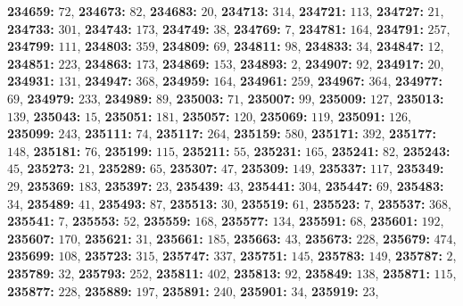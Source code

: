 \textsf{\bfseries 234659:} $72$, \textsf{\bfseries 234673:} $82$, \textsf{\bfseries 234683:} $20$, \textsf{\bfseries 234713:} $314$, \textsf{\bfseries 234721:} $113$, \textsf{\bfseries 234727:} $21$, \textsf{\bfseries 234733:} $301$, \textsf{\bfseries 234743:} $173$, \textsf{\bfseries 234749:} $38$, \textsf{\bfseries 234769:} $7$, \textsf{\bfseries 234781:} $164$, \textsf{\bfseries 234791:} $257$, \textsf{\bfseries 234799:} $111$, \textsf{\bfseries 234803:} $359$, \textsf{\bfseries 234809:} $69$, \textsf{\bfseries 234811:} $98$, \textsf{\bfseries 234833:} $34$, \textsf{\bfseries 234847:} $12$, \textsf{\bfseries 234851:} $223$, \textsf{\bfseries 234863:} $173$, \textsf{\bfseries 234869:} $153$, \textsf{\bfseries 234893:} $2$, \textsf{\bfseries 234907:} $92$, \textsf{\bfseries 234917:} $20$, \textsf{\bfseries 234931:} $131$, \textsf{\bfseries 234947:} $368$, \textsf{\bfseries 234959:} $164$, \textsf{\bfseries 234961:} $259$, \textsf{\bfseries 234967:} $364$, \textsf{\bfseries 234977:} $69$, \textsf{\bfseries 234979:} $233$, \textsf{\bfseries 234989:} $89$, \textsf{\bfseries 235003:} $71$, \textsf{\bfseries 235007:} $99$, \textsf{\bfseries 235009:} $127$, \textsf{\bfseries 235013:} $139$, \textsf{\bfseries 235043:} $15$, \textsf{\bfseries 235051:} $181$, \textsf{\bfseries 235057:} $120$, \textsf{\bfseries 235069:} $119$, \textsf{\bfseries 235091:} $126$, \textsf{\bfseries 235099:} $243$, \textsf{\bfseries 235111:} $74$, \textsf{\bfseries 235117:} $264$, \textsf{\bfseries 235159:} $580$, \textsf{\bfseries 235171:} $392$, \textsf{\bfseries 235177:} $148$, \textsf{\bfseries 235181:} $76$, \textsf{\bfseries 235199:} $115$, \textsf{\bfseries 235211:} $55$, \textsf{\bfseries 235231:} $165$, \textsf{\bfseries 235241:} $82$, \textsf{\bfseries 235243:} $45$, \textsf{\bfseries 235273:} $21$, \textsf{\bfseries 235289:} $65$, \textsf{\bfseries 235307:} $47$, \textsf{\bfseries 235309:} $149$, \textsf{\bfseries 235337:} $117$, \textsf{\bfseries 235349:} $29$, \textsf{\bfseries 235369:} $183$, \textsf{\bfseries 235397:} $23$, \textsf{\bfseries 235439:} $43$, \textsf{\bfseries 235441:} $304$, \textsf{\bfseries 235447:} $69$, \textsf{\bfseries 235483:} $34$, \textsf{\bfseries 235489:} $41$, \textsf{\bfseries 235493:} $87$, \textsf{\bfseries 235513:} $30$, \textsf{\bfseries 235519:} $61$, \textsf{\bfseries 235523:} $7$, \textsf{\bfseries 235537:} $368$, \textsf{\bfseries 235541:} $7$, \textsf{\bfseries 235553:} $52$, \textsf{\bfseries 235559:} $168$, \textsf{\bfseries 235577:} $134$, \textsf{\bfseries 235591:} $68$, \textsf{\bfseries 235601:} $192$, \textsf{\bfseries 235607:} $170$, \textsf{\bfseries 235621:} $31$, \textsf{\bfseries 235661:} $185$, \textsf{\bfseries 235663:} $43$, \textsf{\bfseries 235673:} $228$, \textsf{\bfseries 235679:} $474$, \textsf{\bfseries 235699:} $108$, \textsf{\bfseries 235723:} $315$, \textsf{\bfseries 235747:} $337$, \textsf{\bfseries 235751:} $145$, \textsf{\bfseries 235783:} $149$, \textsf{\bfseries 235787:} $2$, \textsf{\bfseries 235789:} $32$, \textsf{\bfseries 235793:} $252$, \textsf{\bfseries 235811:} $402$, \textsf{\bfseries 235813:} $92$, \textsf{\bfseries 235849:} $138$, \textsf{\bfseries 235871:} $115$, \textsf{\bfseries 235877:} $228$, \textsf{\bfseries 235889:} $197$, \textsf{\bfseries 235891:} $240$, \textsf{\bfseries 235901:} $34$, \textsf{\bfseries 235919:} $23$, 

